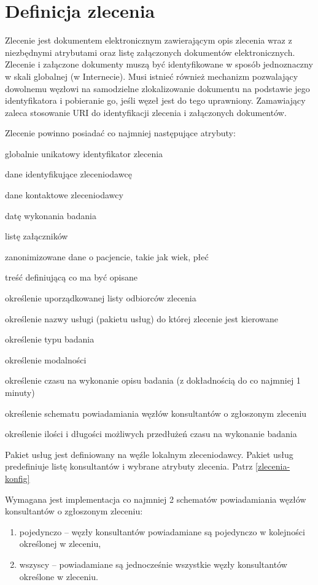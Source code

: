 \documentclass[a4paper]{report}
\begin{document}
\section{Definicja zlecenia}

Zlecenie jest dokumentem elektronicznym zawierającym opis zlecenia wraz z niezbędnymi atrybutami oraz listę załączonych dokumentów elektronicznych. Zlecenie i załączone dokumenty muszą być identyfikowane w sposób jednoznaczny w skali globalnej (w Internecie). Musi istnieć również mechanizm pozwalający dowolnemu węzłowi na samodzielne zlokalizowanie dokumentu na podstawie jego identyfikatora i pobieranie go, jeśli węzeł jest do tego uprawniony. Zamawiający zaleca stosowanie URI do identyfikacji zlecenia i załączonych dokumentów.

Zlecenie powinno posiadać co najmniej następujące atrybuty:
\begin{enumerate*}
\item globalnie unikatowy identyfikator zlecenia
\item dane identyfikujące zleceniodawcę
\item dane kontaktowe zleceniodawcy
\item datę wykonania badania
\item listę załączników 
\item zanonimizowane dane o pacjencie, takie jak wiek, płeć
\item treść definiującą co ma być opisane
\item określenie uporządkowanej listy odbiorców zlecenia
\item określenie nazwy usługi (pakietu usług) do której zlecenie jest kierowane
\item określenie typu badania
\item określenie modalności
\item określenie czasu na wykonanie opisu badania (z dokładnością do co najmniej 1 minuty)
\item określenie schematu powiadamiania węzłów konsultantów o zgłoszonym zleceniu 
\item określenie ilości i długości możliwych przedłużeń czasu na wykonanie badania
\end{enumerate*}

Pakiet usług jest definiowany na węźle lokalnym zleceniodawcy. Pakiet usług predefiniuje listę konsultantów i wybrane atrybuty zlecenia. Patrz \ref{zlecenia-konfig}

Wymagana jest implementacja co najmniej 2 schematów powiadamiania węzłów konsultantów o zgłoszonym zleceniu:
\begin{enumerate}
 \item pojedynczo -- węzły konsultantów powiadamiane są pojedynczo w kolejności określonej w zleceniu,
 \item wszyscy -- powiadamiane są jednocześnie wszystkie węzły konsultantów określone w zleceniu.
\end{enumerate}
\end{document}
